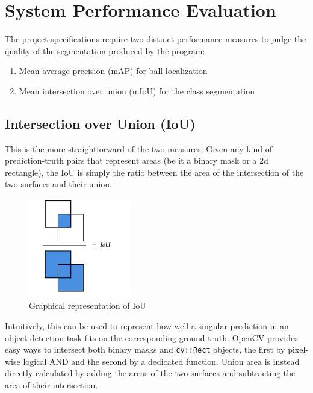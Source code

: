 \section{System Performance Evaluation}

The project specifications require two distinct performance 
measures to judge the quality of the segmentation produced 
by the program:

\begin{enumerate}
    \item Mean average precision (mAP) for ball localization
    \item Mean intersection over union (mIoU) for the class segmentation
\end{enumerate}



\subsection{Intersection over Union (IoU)}

This is the more straightforward of the two measures. 
Given any kind of prediction-truth pairs that represent 
areas (be it a binary mask or a 2d rectangle), the IoU is 
simply the ratio between the area of the intersection of the 
two surfaces and their union.

\begin{figure}[h]
    \centering
    \includegraphics[width=0.4\textwidth]{./imgs/iou.png}
    \caption{Graphical representation of IoU}
\end{figure}

Intuitively, this can be used to represent how well a singular 
prediction in an object detection task fits on the corresponding 
ground truth.
OpenCV provides easy ways to intersect both binary masks and 
\verb|cv::Rect| objects, the first by pixel-wise logical AND 
and the second by a dedicated function.
Union area is instead directly calculated by adding the 
areas of the two surfaces and subtracting the area of 
their intersection.


